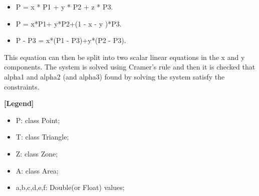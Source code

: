 \begin{itemize}
	\item P = x * P1 + y * P2 + z * P3. 
	\item P = x*P1+ y*P2+(1 - x - y )*P3.
	\item P - P3 = x*(P1 - P3)+y*(P2 - P3).
\end{itemize}

This equation can then be split into two scalar linear equations in the x and y components. The system is solved using Cramer's rule and then it is checked that alpha1 and alpha2 (and alpha3) found by solving the system satisfy the constraints.

\textbf{[Legend]}
\begin{itemize}
	\item P: class Point;
	\item T: class Triangle;
	\item Z:  class Zone;
	\item A: class Area;
	\item a,b,c,d,e,f: Double(or Float) values;
\end{itemize}

